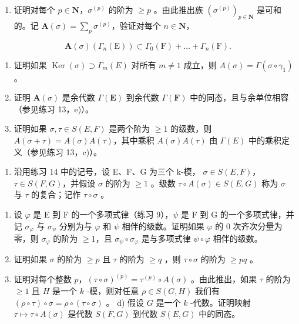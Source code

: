 \begin{enumerate}
\def\labelenumi{\alph{enumi})}
\tightlist
\item
  证明对每个 \(p \in \mathbf{N}\)，\(\sigma^{(p)}\) 的阶为 \(\geqslant p\) 。由此推出族 \((\sigma^{(p)})_{p \in \mathbf{N}}\) 是可和的。记 \(\mathbf{A}(\sigma) = \sum_{p} \sigma^{(p)}\)，验证对每个 \(n \in \mathbf{N}\)，
\end{enumerate}

\[
\mathbf {A} (\sigma) \left(\Gamma_ {n} (\mathrm{E})\right) \subset \Gamma_ {0} (\mathrm{F}) + \dots + \Gamma_ {n} (\mathrm{F}).
\]

\begin{enumerate}
\def\labelenumi{\alph{enumi})}
\setcounter{enumi}{1}
\item
  证明如果 \(\operatorname{Ker}(\sigma) \supset \Gamma_m(E)\) 对所有 \(m \neq 1\) 成立，则 \(A(\sigma) = \Gamma(\sigma \circ \gamma_1)\) 。
\item
  证明 \(\mathbf{A}(\sigma)\) 是余代数 \(\Gamma(\mathbf{E})\) 到余代数 \(\Gamma(\mathbf{F})\) 中的同态，且与余单位相容（参见练习 13，e)）。
\item
  证明如果 \(\sigma, \tau \in S(E, F)\) 是两个阶为 \(\geqslant 1\) 的级数，则 \(A(\sigma + \tau) = A(\sigma)A(\tau)\)，其中乘积 \(A(\sigma)A(\tau)\) 由 \(\Gamma(E)\) 中的乘积定义（参见练习 13，c)）。
\end{enumerate}

\begin{enumerate}
\def\labelenumi{\arabic{enumi})}
\setcounter{enumi}{14}
\tightlist
\item
  沿用练习 14 中的记号，设 E、F、G 为三个 k-模， \(\sigma \in S(E, F)\)，\(\tau \in S(F, G)\)，并假设 \(\sigma\) 的阶为 \(\geqslant 1\) 。级数 \(\tau \circ A(\sigma) \in S(E, G)\) 称为 \(\sigma\) 与 \(\tau\) 的复合；记作 \(\tau \circ \sigma\) 。
\end{enumerate}

\begin{enumerate}
\def\labelenumi{\alph{enumi})}
\item
  设 \(\varphi\) 是 E 到 F 的一个多项式律（练习 9），\(\psi\) 是 F 到 G 的一个多项式律，并记 \(\sigma_{\varphi}\) 与 \(\sigma_{\psi}\) 分别为与 \(\varphi\) 和 \(\psi\) 相伴的级数。证明如果 \(\varphi\) 的 0 次齐次分量为零，则 \(\sigma_{\varphi}\) 的阶为 \(\geqslant 1\)，且 \(\sigma_{\psi} \circ \sigma_{\varphi}\) 是与多项式律 \(\psi \circ \varphi\) 相伴的级数。
\item
  证明如果 \(\sigma\) 的阶为 \(\geqslant p\) 且 \(\tau\) 的阶为 \(\geqslant q\) ，则 \(\tau \circ \sigma\) 的阶为 \(\geqslant pq\) 。
\item
  证明对每个整数 \(p\)，\((\tau \circ \sigma)^{(p)} = \tau^{(p)} \circ A(\sigma)\) 。由此推出，如果 \(\tau\) 的阶为 \(\geqslant 1\) 且 \(H\) 是一个 \(k\) -模，则对任意 \(\rho \in S(G, H)\) 我们有 \((\rho \circ \tau) \circ \sigma = \rho \circ (\tau \circ \sigma)\) 。 d) 假设 \(G\) 是一个 \(k\) -代数。证明映射 \(\tau \mapsto \tau \circ A(\sigma)\) 是代数 \(S(F, G)\) 到代数 \(S(E, G)\) 中的同态。
\end{enumerate}

